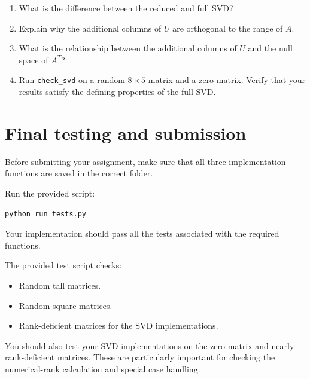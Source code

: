 \documentclass{ximera}
\begin{document}
\begin{exercise}

\begin{enumerate}

    \item What is the difference between the reduced and full SVD?

    \item Explain why the additional columns of $U$ are
    orthogonal to the range of $A$.

    \item What is the relationship between the additional
    columns of $U$ and the null space of $A^T$?

    \item Run \texttt{check\_svd} on a random $8\times5$ matrix
    and a zero matrix. Verify that your results satisfy the
    defining properties of the full SVD.

\end{enumerate}

\end{exercise}

\section*{Final testing and submission}

Before submitting your assignment, make sure that all three
implementation functions are saved in the correct folder.

Run the provided script:

\begin{verbatim}
python run_tests.py
\end{verbatim}

Your implementation should pass all the tests associated with
the required functions.

The provided test script checks:

\begin{itemize}
    \item Random tall matrices.
    \item Random square matrices.
    \item Rank-deficient matrices for the SVD implementations.
\end{itemize}

You should also test your SVD implementations on the zero matrix
and nearly rank-deficient matrices. These are particularly
important for checking the numerical-rank calculation and
special case handling.
\end{document}
